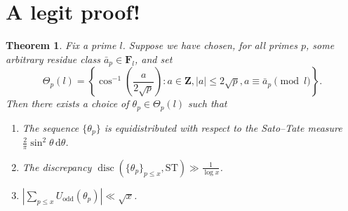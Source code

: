 \documentclass{article}
\DeclareMathOperator{\disc}{disc}
\newcommand{\bF}{\mathbf{F}}
\newcommand{\bZ}{\mathbf{Z}}
\newcommand{\dd}{\mathrm{d}}
\newcommand{\ST}{\mathrm{ST}}
\newtheorem{theorem}{Theorem}
\begin{document}
\section{A legit proof!}

\begin{theorem}
Fix a prime $l$. Suppose we have chosen, for all primes $p$, some arbitrary 
residue class $\bar a_p\in \bF_l$, and set 
\[
	\Theta_p(l) = \left\{\cos^{-1}\left(\frac{a}{2\sqrt p}\right) : a\in \bZ, |a|\leqslant 2\sqrt p, a \equiv \bar a_p\pmod l\right\} .
\]
Then there exists a choice of $\theta_p\in \Theta_p(l)$ such that 
\begin{enumerate}
\item
The sequence $\{\theta_p\}$ is equidistributed with respect to the Sato--Tate 
measure $\frac{2}{\pi}\sin^2\theta\, \dd \theta$. 

\item
The discrepancy $\disc(\{\theta_p\}_{p\leqslant x}, \ST) \gg \frac{1}{\log x}$. 

\item
$\left| \sum_{p\leqslant x} U_\mathrm{odd}(\theta_p)\right| \ll \sqrt x$. 
\end{enumerate}
\end{theorem}
\end{document}
